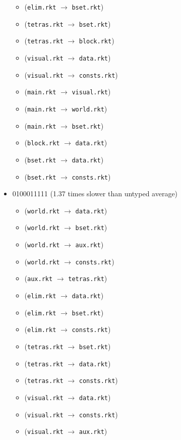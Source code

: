\documentclass{article}
\newcommand{\mono}[1]{\texttt{#1}}
\begin{document}
\begin{itemize}
\begin{itemize}
  \item (\mono{elim.rkt} $\rightarrow$ \mono{bset.rkt})
  \item (\mono{tetras.rkt} $\rightarrow$ \mono{bset.rkt})
  \item (\mono{tetras.rkt} $\rightarrow$ \mono{block.rkt})
  \item (\mono{visual.rkt} $\rightarrow$ \mono{data.rkt})
  \item (\mono{visual.rkt} $\rightarrow$ \mono{consts.rkt})
  \item (\mono{main.rkt} $\rightarrow$ \mono{visual.rkt})
  \item (\mono{main.rkt} $\rightarrow$ \mono{world.rkt})
  \item (\mono{main.rkt} $\rightarrow$ \mono{bset.rkt})
  \item (\mono{block.rkt} $\rightarrow$ \mono{data.rkt})
  \item (\mono{bset.rkt} $\rightarrow$ \mono{data.rkt})
  \item (\mono{bset.rkt} $\rightarrow$ \mono{consts.rkt})
  \end{itemize}
\item 0100011111 (1.37 times slower than untyped average)
  \begin{itemize}
  \item (\mono{world.rkt} $\rightarrow$ \mono{data.rkt})
  \item (\mono{world.rkt} $\rightarrow$ \mono{bset.rkt})
  \item (\mono{world.rkt} $\rightarrow$ \mono{aux.rkt})
  \item (\mono{world.rkt} $\rightarrow$ \mono{consts.rkt})
  \item (\mono{aux.rkt} $\rightarrow$ \mono{tetras.rkt})
  \item (\mono{elim.rkt} $\rightarrow$ \mono{data.rkt})
  \item (\mono{elim.rkt} $\rightarrow$ \mono{bset.rkt})
  \item (\mono{elim.rkt} $\rightarrow$ \mono{consts.rkt})
  \item (\mono{tetras.rkt} $\rightarrow$ \mono{bset.rkt})
  \item (\mono{tetras.rkt} $\rightarrow$ \mono{data.rkt})
  \item (\mono{tetras.rkt} $\rightarrow$ \mono{consts.rkt})
  \item (\mono{visual.rkt} $\rightarrow$ \mono{data.rkt})
  \item (\mono{visual.rkt} $\rightarrow$ \mono{consts.rkt})
  \item (\mono{visual.rkt} $\rightarrow$ \mono{aux.rkt})

\end{itemize}
\end{itemize}
\end{document}
